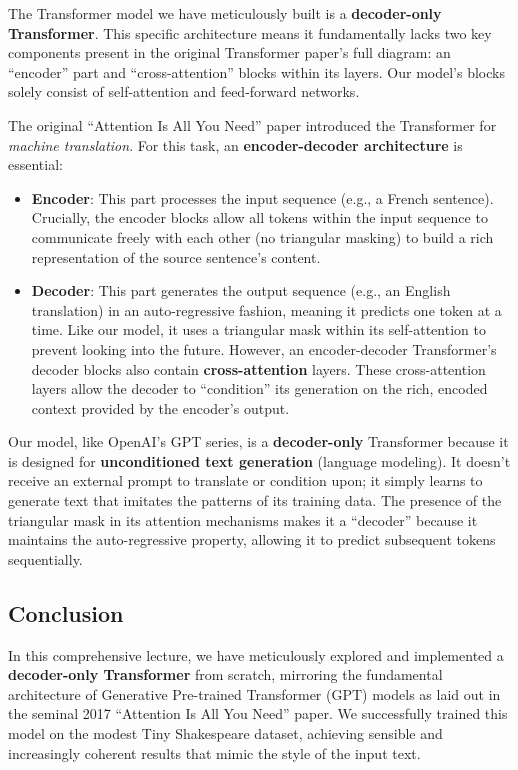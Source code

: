 The Transformer model we have meticulously built is a \textbf{decoder-only Transformer}. This specific architecture means it fundamentally lacks two key components present in the original Transformer paper's full diagram: an ``encoder'' part and ``cross-attention'' blocks within its layers. Our model's blocks solely consist of self-attention and feed-forward networks.

The original ``Attention Is All You Need'' paper introduced the Transformer for \textit{machine translation}. For this task, an \textbf{encoder-decoder architecture} is essential:
\begin{itemize}
    \item \textbf{Encoder}: This part processes the input sequence (e.g., a French sentence). Crucially, the encoder blocks allow all tokens within the input sequence to communicate freely with each other (no triangular masking) to build a rich representation of the source sentence's content.
    \item \textbf{Decoder}: This part generates the output sequence (e.g., an English translation) in an auto-regressive fashion, meaning it predicts one token at a time. Like our model, it uses a triangular mask within its self-attention to prevent looking into the future. However, an encoder-decoder Transformer's decoder blocks also contain \textbf{cross-attention} layers. These cross-attention layers allow the decoder to ``condition'' its generation on the rich, encoded context provided by the encoder's output.
\end{itemize}

Our model, like OpenAI's GPT series, is a \textbf{decoder-only} Transformer because it is designed for \textbf{unconditioned text generation} (language modeling). It doesn't receive an external prompt to translate or condition upon; it simply learns to generate text that imitates the patterns of its training data. The presence of the triangular mask in its attention mechanisms makes it a ``decoder'' because it maintains the auto-regressive property, allowing it to predict subsequent tokens sequentially.

\subsection{Conclusion}

In this comprehensive lecture, we have meticulously explored and implemented a \textbf{decoder-only Transformer} from scratch, mirroring the fundamental architecture of Generative Pre-trained Transformer (GPT) models as laid out in the seminal 2017 ``Attention Is All You Need'' paper. We successfully trained this model on the modest Tiny Shakespeare dataset, achieving sensible and increasingly coherent results that mimic the style of the input text.

